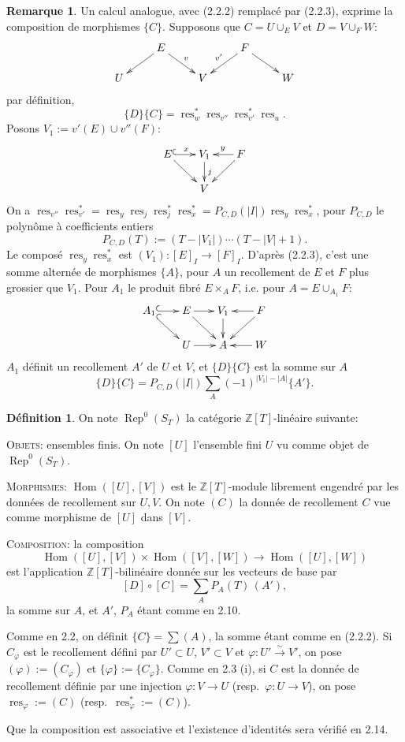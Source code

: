 \documentclass[11pt,a4paper]{article}
\theoremstyle{plain}
\theoremstyle{definition}
\newtheorem{definition}[theorem]{D\'efinition}
\newtheorem{remark}[theorem]{Remarque}
\DeclareMathOperator{\Hom}{Hom}
\DeclareMathOperator{\Rep}{Rep}
\DeclareMathOperator{\res}{res}
\newcommand{\Z}{\mathbb{Z}}
\newcommand{\isom}{\xrightarrow{\sim}}
\begin{document}
\begin{remark}
Un calcul analogue, avec (2.2.2) remplac\'e par (2.2.3), exprime la composition de morphismes $\{C\}$. Supposons que $C = U \cup_E V$ et $D = V \cup_F W$:
\[
\xymatrix@R=1.2pc{
& E \ar[dl] \ar[dr]^{v} & & F \ar[dl]_{v'} \ar[dr] \\
U & & V & & W
}
\]
par d\'efinition,
\[
\{D\}\{C\} = \res^*_w \res_{v''} \res^*_{v'} \res_u.
\]
Posons $V_1 := v'(E) \cup v''(F)$:
\[
\xymatrix@R=1.5pc@C=1.5pc{
E \ar[dr] \ar@{^{(}->}[r]^{x} & V_1 \ar[d]^{j} & F \ar[l]_{y} \ar[dl] \\
& V
}
\]
On a $\res_{v''} \res^*_{v'} = \res_y \res_j \res^*_j \res^*_x = P_{C,D}(|I|) \res_y \res^*_x$, pour $P_{C,D}$ le polyn\^ome \`a coefficients entiers
\begin{equation}
P_{C,D}(T) := (T - |V_1|) \cdots (T - |V| + 1). \tag{2.11.1}
\end{equation}
Le compos\'e $\res_y \res^*_x$ est $(V_1) : [E]_I \to [F]_I$. D'apr\`es (2.2.3), c'est une somme altern\'ee de morphismes $\{A\}$, pour $A$ un recollement de $E$ et $F$ plus grossier que $V_1$. Pour $A_1$ le produit fibr\'e $E \times_A F$, i.e. pour $A = E \cup_{A_1} F$:
\[
\xymatrix@R=1.5pc@C=1.5pc{
A_1 \ar@{^{(}->}[r] \ar@{^{(}->}[dr] & E \ar[dr] \ar[r] & V_1 \ar[d] & F \ar[l] \ar[dl] \\
& U \ar[r] & A & W \ar[l]
}
\]
$A_1$ d\'efinit un recollement $A'$ de $U$ et $V$, et $\{D\}\{C\}$ est la somme sur $A$
\begin{equation}
\{D\}\{C\} = P_{C,D}(|I|) \sum_A (-1)^{|V_1| - |A|} \{A'\}. \tag{2.11.2}
\end{equation}
\end{remark}

\begin{definition}
On note $\Rep^0(S_T)$ la cat\'egorie $\Z[T]$-lin\'eaire suivante:

\textsc{Objets}: ensembles finis. On note $[U]$ l'ensemble fini $U$ vu comme objet de $\Rep^0(S_T)$.

\textsc{Morphismes}: $\Hom([U], [V])$ est le $\Z[T]$-module librement engendr\'e par les donn\'ees de recollement sur $U, V$. On note $(C)$ la donn\'ee de recollement $C$ vue comme morphisme de $[U]$ dans $[V]$.

\textsc{Composition}: la composition
\[
\Hom([U], [V]) \times \Hom([V], [W]) \to \Hom([U], [W])
\]
est l'application $\Z[T]$-bilin\'eaire donn\'ee sur les vecteurs de base par
\[
[D] \circ [C] = \sum_A P_A(T)\,(A'),
\]
la somme sur $A$, et $A'$, $P_A$ \'etant comme en 2.10.

Comme en 2.2, on d\'efinit $\{C\} = \sum (A)$, la somme \'etant comme en (2.2.2). Si $C_\varphi$ est le recollement d\'efini par $U' \subset U$, $V' \subset V$ et $\varphi : U' \isom V'$, on pose $(\varphi) := (C_\varphi)$ et $\{\varphi\} := \{C_\varphi\}$. Comme en 2.3 (i), si $C$ est la donn\'ee de recollement d\'efinie par une injection $\varphi : V \to U$ (resp.~$\varphi : U \to V$), on pose $\res_\varphi := (C)$ (resp.~$\res^*_\varphi := (C)$).

Que la composition est associative et l'existence d'identit\'es sera v\'erifi\'e en 2.14.
\end{definition}
\end{document}
